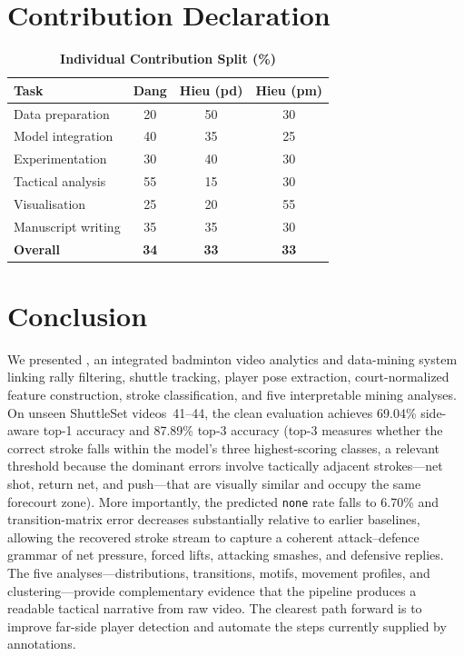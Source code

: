 \section*{Contribution Declaration}

\begin{table}[h]
  \centering\small
  \setlength{\tabcolsep}{5pt}
  \renewcommand{\arraystretch}{1.2}
  \caption*{\textbf{Individual Contribution Split (\%)}}
  \begin{tabular}{lccc}
    \toprule
    \textbf{Task} & \textbf{Dang} & \textbf{Hieu (pd)} & \textbf{Hieu (pm)} \\
    \midrule
    Data preparation         & 20 & 50 & 30 \\
    Model integration        & 40 & 35 & 25 \\
    Experimentation          & 30 & 40 & 30 \\
    Tactical analysis        & 55 & 15 & 30 \\
    Visualisation            & 25 & 20 & 55 \\
    Manuscript writing       & 35 & 35 & 30 \\
    \midrule
    \textbf{Overall}         & \textbf{34} & \textbf{33} & \textbf{33} \\
    \bottomrule
  \end{tabular}
\end{table}

\section{Conclusion}

We presented \method, an integrated badminton video analytics and data-mining
system linking rally filtering, shuttle tracking, player pose extraction,
court-normalized feature construction, stroke classification, and five
interpretable mining analyses. On unseen ShuttleSet videos~41--44, the clean
evaluation achieves 69.04\% side-aware top-1 accuracy and 87.89\% top-3
accuracy (top-3 measures whether the correct stroke falls within the
model's three highest-scoring classes, a relevant threshold because the
dominant errors involve tactically adjacent strokes---net shot, return
net, and push---that are visually similar and occupy the same forecourt
zone). More importantly, the predicted \texttt{none} rate falls to 6.70\%
and transition-matrix error decreases substantially relative to earlier
baselines, allowing the recovered stroke stream to capture a coherent
attack–defence grammar of net pressure, forced lifts, attacking smashes, and
defensive replies. The five analyses—distributions, transitions, motifs,
movement profiles, and clustering—provide complementary evidence that the
pipeline produces a readable tactical narrative from raw video. The clearest
path forward is to improve far-side player detection and automate the steps
currently supplied by annotations.